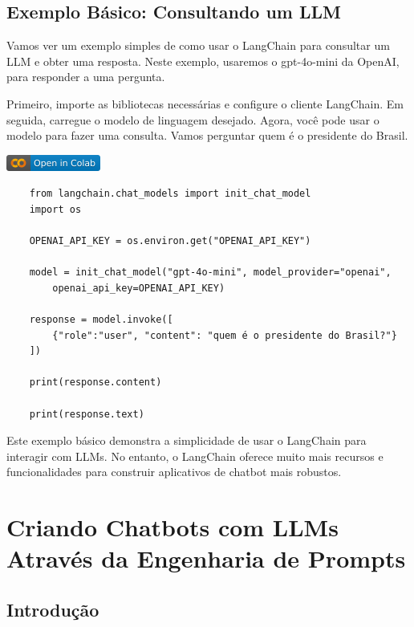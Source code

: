 \documentclass[14pt,a4paper,oneside]{book}
\begin{document}
\section{Exemplo Básico: Consultando um LLM}

Vamos ver um exemplo simples de como usar o LangChain para consultar um LLM e obter uma resposta. Neste exemplo, usaremos o gpt-4o-mini da OpenAI, para responder a uma pergunta.

Primeiro, importe as bibliotecas necessárias e configure o cliente LangChain. Em seguida, carregue o modelo de linguagem desejado. Agora, você pode usar o modelo para fazer uma consulta. Vamos perguntar quem é o presidente do Brasil.

\vspace{\baselineskip}
\href{https://colab.research.google.com/github/giseldo/chatbotbook_v2/blob/main/notebook/langchain.ipynb}{
  \includegraphics{./fig/colab-badge.png}
}

\begin{verbatim}
	from langchain.chat_models import init_chat_model
	import os

	OPENAI_API_KEY = os.environ.get("OPENAI_API_KEY")

	model = init_chat_model("gpt-4o-mini", model_provider="openai", 
		openai_api_key=OPENAI_API_KEY)

	response = model.invoke([
		{"role":"user", "content": "quem é o presidente do Brasil?"}
	])

	print(response.content)

	print(response.text)
\end{verbatim}

Este exemplo básico demonstra a simplicidade de usar o LangChain para interagir com LLMs. No entanto, o LangChain oferece muito mais recursos e funcionalidades para construir aplicativos de chatbot mais robustos.


\chapter{Criando Chatbots com LLMs Através da Engenharia de Prompts}

\section{Introdução}
\end{document}
